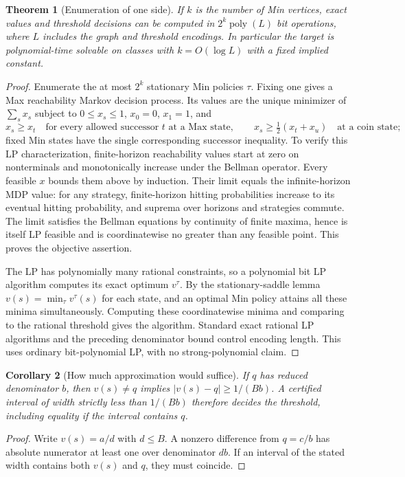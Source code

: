 \documentclass[11pt]{article}
\newtheorem{theorem}{Theorem}
\newtheorem{corollary}[theorem]{Corollary}
\theoremstyle{definition}
\begin{document}
\begin{theorem}[Enumeration of one side]
If $k$ is the number of Min vertices, exact values and threshold decisions can
be computed in $2^k\operatorname{poly}(L)$ bit operations, where $L$ includes
the graph and threshold encodings. In particular the target is polynomial-time
solvable on classes with $k=O(\log L)$ with a fixed implied constant.
\end{theorem}
\begin{proof}
Enumerate the at most $2^k$ stationary Min policies $\tau$. Fixing one gives
a Max reachability Markov decision process. Its values are the unique minimizer
of $\sum_s x_s$ subject to $0\leq x_s\leq1$, $x_0=0$, $x_1=1$, and
\[
 x_s\geq x_t\quad\text{for every allowed successor $t$ at a Max state},
 \qquad x_s\geq\tfrac12(x_t+x_u)\quad\text{at a coin state};
\]
fixed Min states have the single corresponding successor inequality.
To verify this LP characterization, finite-horizon reachability values start
at zero on nonterminals and monotonically increase under the Bellman operator.
Every feasible $x$ bounds them above by induction. Their limit equals the
infinite-horizon MDP value: for any strategy, finite-horizon hitting probabilities
increase to its eventual hitting probability, and suprema over horizons and
strategies commute. The limit satisfies the Bellman equations by continuity
of finite maxima, hence is itself LP feasible and is coordinatewise no greater
than any feasible point. This proves the objective assertion.

The LP has polynomially many rational constraints, so a polynomial bit LP
algorithm computes its exact optimum $v^\tau$. By the stationary-saddle lemma
$v(s)=\min_\tau v^\tau(s)$ for each state, and an optimal Min policy attains all
these minima simultaneously. Computing these coordinatewise minima and
comparing to the rational threshold gives the algorithm. Standard exact rational
LP algorithms and the preceding denominator bound control encoding length.
This uses ordinary bit-polynomial LP, with no strong-polynomial claim.
\end{proof}

\begin{corollary}[How much approximation would suffice]
If $q$ has reduced denominator $b$, then $v(s)\ne q$ implies
$|v(s)-q|\geq1/(Bb)$. A certified interval of width strictly less than
$1/(Bb)$ therefore decides the threshold, including equality if the interval
contains $q$.
\end{corollary}
\begin{proof}
Write $v(s)=a/d$ with $d\leq B$. A nonzero difference from $q=c/b$ has
absolute numerator at least one over denominator $db$. If an interval of the
stated width contains both $v(s)$ and $q$, they must coincide.
\end{proof}
\end{document}
